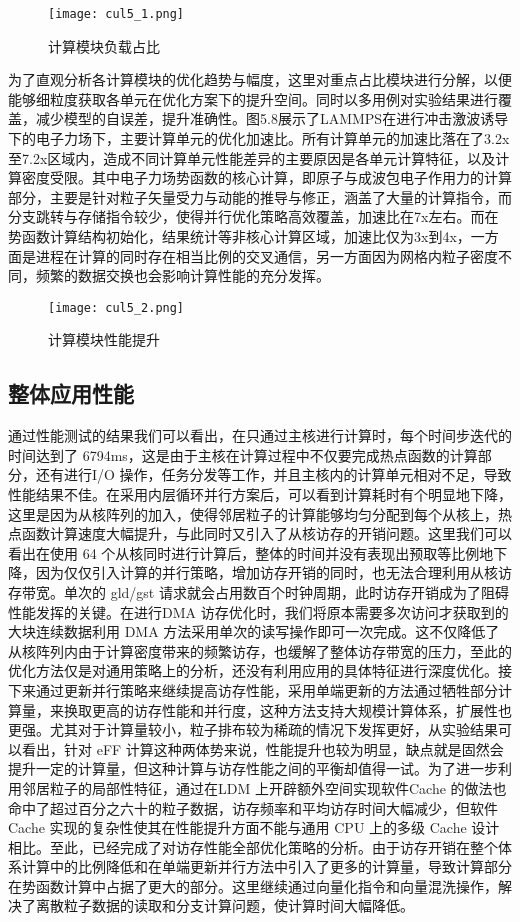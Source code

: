  \begin{figure}[h]
  \centering
  \texttt{[image: cul5\_1.png]}
  \caption{计算模块负载占比}
 \end{figure}

 为了直观分析各计算模块的优化趋势与幅度，这里对重点占比模块进行分解，以便能够细粒度获取各单元在优化方案下的提升空间。同时以多用例对实验结果进行覆盖，减少模型的自误差，提升准确性。图5.8展示了LAMMPS在进行冲击激波诱导下的电子力场下，主要计算单元的优化加速比。所有计算单元的加速比落在了3.2x至7.2x区域内，造成不同计算单元性能差异的主要原因是各单元计算特征，以及计算密度受限。其中电子力场势函数的核心计算，即原子与成波包电子作用力的计算部分，主要是针对粒子矢量受力与动能的推导与修正，涵盖了大量的计算指令，而分支跳转与存储指令较少，使得并行优化策略高效覆盖，加速比在7x左右。而在势函数计算结构初始化，结果统计等非核心计算区域，加速比仅为3x到4x，一方面是进程在计算的同时存在相当比例的交叉通信，另一方面因为网格内粒子密度不同，频繁的数据交换也会影响计算性能的充分发挥。

  \begin{figure}[h]
  \centering
  \texttt{[image: cul5\_2.png]}
  \caption{计算模块性能提升}
 \end{figure}

\subsection{整体应用性能}
 通过性能测试的结果我们可以看出，在只通过主核进行计算时，每个时间步迭代的时间达到了 6794ms，这是由于主核在计算过程中不仅要完成热点函数的计算部分，还有进行I/O 操作，任务分发等工作，并且主核内的计算单元相对不足，导致性能结果不佳。在采用内层循环并行方案后，可以看到计算耗时有个明显地下降，这里是因为从核阵列的加入，使得邻居粒子的计算能够均匀分配到每个从核上，热点函数计算速度大幅提升，与此同时又引入了从核访存的开销问题。这里我们可以看出在使用 64 个从核同时进行计算后，整体的时间并没有表现出预取等比例地下降，因为仅仅引入计算的并行策略，增加访存开销的同时，也无法合理利用从核访存带宽。单次的 gld/gst 请求就会占用数百个时钟周期，此时访存开销成为了阻碍性能发挥的关键。在进行DMA 访存优化时，我们将原本需要多次访问才获取到的大块连续数据利用 DMA 方法采用单次的读写操作即可一次完成。这不仅降低了从核阵列内由于计算密度带来的频繁访存，也缓解了整体访存带宽的压力，至此的优化方法仅是对通用策略上的分析，还没有利用应用的具体特征进行深度优化。接下来通过更新并行策略来继续提高访存性能，采用单端更新的方法通过牺牲部分计算量，来换取更高的访存性能和并行度，这种方法支持大规模计算体系，扩展性也更强。尤其对于计算量较小，粒子排布较为稀疏的情况下发挥更好，从实验结果可以看出，针对 eFF 计算这种两体势来说，性能提升也较为明显，缺点就是固然会提升一定的计算量，但这种计算与访存性能之间的平衡却值得一试。为了进一步利用邻居粒子的局部性特征，通过在LDM 上开辟额外空间实现软件Cache 的做法也命中了超过百分之六十的粒子数据，访存频率和平均访存时间大幅减少，但软件Cache 实现的复杂性使其在性能提升方面不能与通用 CPU 上的多级 Cache 设计相比。至此，已经完成了对访存性能全部优化策略的分析。由于访存开销在整个体系计算中的比例降低和在单端更新并行方法中引入了更多的计算量，导致计算部分在势函数计算中占据了更大的部分。这里继续通过向量化指令和向量混洗操作，解决了离散粒子数据的读取和分支计算问题，使计算时间大幅降低。
 
